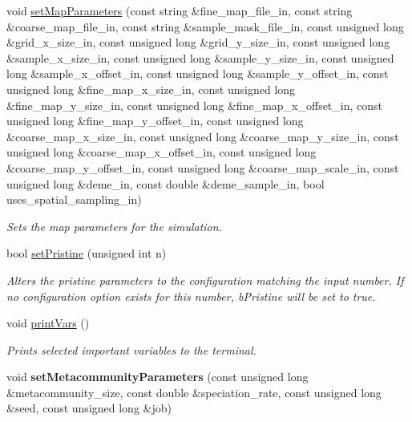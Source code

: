 \begin{DoxyCompactItemize}
void \hyperlink{struct_sim_parameters_a4073ee2bf48a25eebdc0439e3b8625e7}{set\+Map\+Parameters} (const string \&fine\+\_\+map\+\_\+file\+\_\+in, const string \&coarse\+\_\+map\+\_\+file\+\_\+in, const string \&sample\+\_\+mask\+\_\+file\+\_\+in, const unsigned long \&grid\+\_\+x\+\_\+size\+\_\+in, const unsigned long \&grid\+\_\+y\+\_\+size\+\_\+in, const unsigned long \&sample\+\_\+x\+\_\+size\+\_\+in, const unsigned long \&sample\+\_\+y\+\_\+size\+\_\+in, const unsigned long \&sample\+\_\+x\+\_\+offset\+\_\+in, const unsigned long \&sample\+\_\+y\+\_\+offset\+\_\+in, const unsigned long \&fine\+\_\+map\+\_\+x\+\_\+size\+\_\+in, const unsigned long \&fine\+\_\+map\+\_\+y\+\_\+size\+\_\+in, const unsigned long \&fine\+\_\+map\+\_\+x\+\_\+offset\+\_\+in, const unsigned long \&fine\+\_\+map\+\_\+y\+\_\+offset\+\_\+in, const unsigned long \&coarse\+\_\+map\+\_\+x\+\_\+size\+\_\+in, const unsigned long \&coarse\+\_\+map\+\_\+y\+\_\+size\+\_\+in, const unsigned long \&coarse\+\_\+map\+\_\+x\+\_\+offset\+\_\+in, const unsigned long \&coarse\+\_\+map\+\_\+y\+\_\+offset\+\_\+in, const unsigned long \&coarse\+\_\+map\+\_\+scale\+\_\+in, const unsigned long \&deme\+\_\+in, const double \&deme\+\_\+sample\+\_\+in, bool uses\+\_\+spatial\+\_\+sampling\+\_\+in)
\begin{DoxyCompactList}\small\item\em Sets the map parameters for the simulation. \end{DoxyCompactList}\item 
bool \hyperlink{struct_sim_parameters_a35fef102ce86c4158d2ae0e19ad0a85e}{set\+Pristine} (unsigned int n)
\begin{DoxyCompactList}\small\item\em Alters the pristine parameters to the configuration matching the input number. If no configuration option exists for this number, b\+Pristine will be set to true. \end{DoxyCompactList}\item 
void \hyperlink{struct_sim_parameters_ac7072f58a9dccc718341d25a84148ffc}{print\+Vars} ()\hypertarget{struct_sim_parameters_ac7072f58a9dccc718341d25a84148ffc}{}\label{struct_sim_parameters_ac7072f58a9dccc718341d25a84148ffc}

\begin{DoxyCompactList}\small\item\em Prints selected important variables to the terminal. \end{DoxyCompactList}\item 
void {\bfseries set\+Metacommunity\+Parameters} (const unsigned long \&metacommunity\+\_\+size, const double \&speciation\+\_\+rate, const unsigned long \&seed, const unsigned long \&job)\hypertarget{struct_sim_parameters_a8a245d9aef5595c7d3b4e29e3b1a2ef2}{}\label{struct_sim_parameters_a8a245d9aef5595c7d3b4e29e3b1a2ef2}

\end{DoxyCompactItemize}
